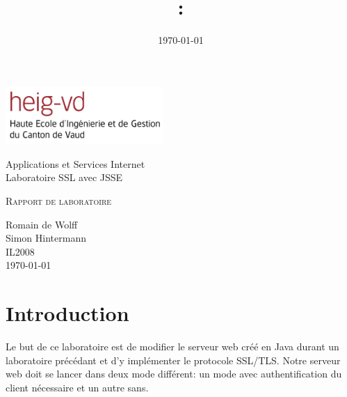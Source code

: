 \documentclass[10pt,a4paper,titlepage]{article}
\author{\auteurOne}
\title{\branchetag : \laboname}
\date{\today}
\newcommand{\branche}{Applications et Services Internet}
\newcommand{\laboname}{Laboratoire SSL avec JSSE}
\newcommand{\auteurOne}{Romain de Wolff \\ Simon Hintermann}
\newcommand{\promo}{IL2008}
\newcommand{\titreDocument}{Rapport de laboratoire}
\begin{document}
\pagestyle{headings}
\begin{titlepage}
	\begin{center}

		\includegraphics[width=6cm]{img/HEIG-VD.jpg}

		\vspace{3cm}
		\LARGE \branche %
		\vspace{3cm}\\
		\Huge \laboname \\
		\vspace{3cm}

		\Large \textsc{\titreDocument} \\
		\vspace{3cm}

		\large \auteurOne \\
		\vspace{10pt}
		\normalsize \textsc{\promo} \\
		\vspace{1cm}
		\today
	\end{center}
\end{titlepage}

\tableofcontents
\newpage
\pagestyle{fancy}
 
\section{Introduction}

Le but de ce laboratoire est de modifier le serveur web créé en Java durant un laboratoire précédant et d'y implémenter le protocole SSL/TLS. Notre serveur web doit se lancer dans deux mode différent: un mode avec authentification du client nécessaire et un autre sans. 
\end{document}

